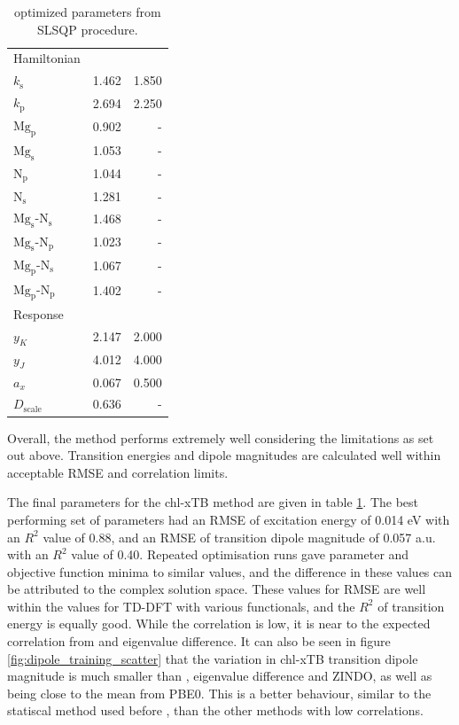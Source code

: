 \begin{table}
    \centering
    \begin{tabular}{|| l r | r ||}
    \hline
    Hamiltonian & & \\
    $k_\text{s}$ & 1.462 & 1.850 \\
    $k_\text{p}$ & 2.694 & 2.250 \\

    $\text{Mg}_\text{p}$ & 0.902 & - \\
    $\text{Mg}_\text{s}$ & 1.053 & - \\
    $\text{N}_\text{p}$ & 1.044 & - \\
    $\text{N}_\text{s}$ & 1.281 & - \\

    $\text{Mg}_\text{s}$-$\text{N}_\text{s}$ & 1.468 & - \\
    $\text{Mg}_\text{s}$-$\text{N}_\text{p}$ & 1.023 & - \\
    $\text{Mg}_\text{p}$-$\text{N}_\text{s}$ & 1.067 & - \\
    $\text{Mg}_\text{p}$-$\text{N}_\text{p}$ & 1.402 & - \\

    \hline\hline
    Response & & \\
    $y_K$ & 2.147 & 2.000 \\
    $y_J$ & 4.012 & 4.000 \\
    $a_x$ & 0.067 & 0.500 \\
    $D_{\text{scale}}$ & 0.636 & - \\
    \hline
    \end{tabular}
    \caption{optimized parameters from SLSQP procedure.}
    \label{table:chl_params}
\end{table}

Overall, the method performs extremely well considering the limitations as set out
above. Transition energies and dipole magnitudes are calculated well within acceptable
RMSE and correlation limits.

The final parameters for the chl-xTB method are given in table \ref{table:chl_params}.
The best performing set of parameters had an RMSE of excitation energy of 0.014 eV 
with an $R^2$ value of 0.88, and an RMSE of transition dipole magnitude of 0.057 a.u. 
with an $R^2$ value of 0.40. Repeated optimisation runs gave parameter and objective
function minima to similar values, and the difference in these values can be attributed
to the complex solution space. These values for RMSE are well within the values
for TD-DFT with various functionals, and the $R^2$ of transition energy is equally
good. While the correlation is low, it is near to the expected correlation from
\dscf and eigenvalue difference. It can also be seen in figure \ref{fig:dipole_training_scatter}
that the variation in chl-xTB transition dipole magnitude is much smaller than \dscf,
eigenvalue difference and ZINDO, as well as being close to the mean from PBE0. This
is a better behaviour, similar to the statiscal method used before \cite{Stross2016},
than the other methods with low correlations.

